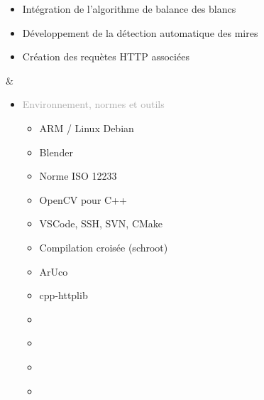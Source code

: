 \documentclass{article}
\begin{document}
\begin{tabular}
\begin{itemize}
\begin{itemize}
\begin{itemize}
                \item \textcolor{gray!100}{Intégration de l'algorithme de balance des blancs}
                \item \textcolor{gray!100}{Développement de la détection automatique des mires}
                \item \textcolor{gray!100}{Création des requètes HTTP associées}
            \end{itemize}
        \end{itemize}
    \end{itemize}
    &
    \begin{itemize}[label={}, topsep=8pt, partopsep=0pt, itemsep=0.5pt, parsep=2pt,after=\vspace*{-\baselineskip}]
        \setlength{\itemsep}{10pt} 
        \item \textcolor{darkGray}{Environnement, normes et outils} 
        \begin{itemize}
        [label={\textcolor{gray!100}{\checkmark}}, topsep=8pt, partopsep=0pt, itemsep=0.5pt, parsep=2pt] 
            \item \textcolor{gray!100}{ARM / Linux Debian}
            \item \textcolor{gray!100}{Blender}
            \item \textcolor{gray!100}{Norme ISO 12233}
            \item \textcolor{gray!100}{OpenCV pour C++}
            \item \textcolor{gray!100}{VSCode, SSH, SVN, CMake}
            \item \textcolor{gray!100}{Compilation croisée (schroot)}
            \item \textcolor{gray!100}{ArUco}
            \item \textcolor{gray!100}{cpp-httplib} 
            \item[\textcolor{white}{\checkmark}] \textcolor{gray!100}{} %
            \item[\textcolor{white}{\checkmark}] \textcolor{gray!100}{} %
            \item[\textcolor{white}{\checkmark}] \textcolor{gray!100}{} %
            \item[\textcolor{white}{\checkmark}] \textcolor{gray!100}{} %
        \end{itemize}
    \end{itemize}
\end{tabular}

\begin{center}
\end{center}
\end{document}
